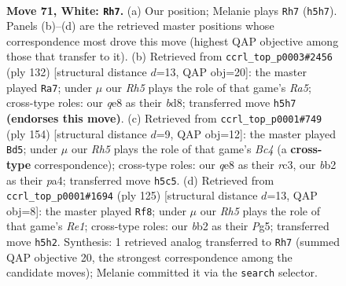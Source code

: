 \documentclass[11pt]{article}
\begin{document}
\clearpage

\begin{figure}[p]\centering
\begin{subfigure}{0.46\textwidth}\centering
\resizebox{\linewidth}{!}{%
\newchessgame
\chessboard[
  setfen={4q3/8/8/7R/1p6/3k1B2/1b6/5K2 w - - 32 71},
  showmover=false,
  pgfstyle=straightmove, color=movearrow, markmove={h5-h7}
]}
\caption{}
\end{subfigure}\hfill
\begin{subfigure}{0.46\textwidth}\centering
\resizebox{\linewidth}{!}{%
\newchessgame
\chessboard[
  setfen={3b4/1b6/8/R7/3B2k1/8/5K2/8 w - - 9 67},
  showmover=false,
  pgfstyle=straightmove, color=movearrow, markmove={a5-a7}
]}
\caption{}
\end{subfigure}
\\[4pt]
\begin{subfigure}{0.46\textwidth}\centering
\resizebox{\linewidth}{!}{%
\newchessgame
\chessboard[
  setfen={8/6k1/4R3/2b5/p1B5/2r5/6K1/8 w - - 12 78},
  showmover=false,
  pgfstyle=straightmove, color=movearrow, markmove={c4-d5}
]}
\caption{}
\end{subfigure}\hfill
\begin{subfigure}{0.46\textwidth}\centering
\resizebox{\linewidth}{!}{%
\newchessgame
\chessboard[
  setfen={4r3/3Q4/7k/6p1/8/1b6/8/7K b - - 9 63},
  showmover=false,
  pgfstyle=straightmove, color=movearrow, markmove={e8-f8}
]}
\caption{}
\end{subfigure}
\caption{\textbf{Move 71, White: \texttt{Rh7}.} (a) Our position; Melanie plays \texttt{Rh7} (\texttt{h5h7}). Panels (b)--(d) are the retrieved master positions whose correspondence most drove this move (highest QAP objective among those that transfer to it). (b) Retrieved from \texttt{ccrl\_top\_p0003\#2456} (ply 132) [structural distance $d$=13, QAP obj=20]: the master played \texttt{Ra7}; under $\mu$ our \emph{Rh5} plays the role of that game's \emph{Ra5}; cross-type roles: our \emph{q}e8 as their \emph{b}d8; transferred move \texttt{h5h7} \textbf{(endorses this move)}. (c) Retrieved from \texttt{ccrl\_top\_p0001\#749} (ply 154) [structural distance $d$=9, QAP obj=12]: the master played \texttt{Bd5}; under $\mu$ our \emph{Rh5} plays the role of that game's \emph{Bc4} (a \textbf{cross-type} correspondence); cross-type roles: our \emph{q}e8 as their \emph{r}c3, our \emph{b}b2 as their \emph{p}a4; transferred move \texttt{h5c5}. (d) Retrieved from \texttt{ccrl\_top\_p0001\#1694} (ply 125) [structural distance $d$=13, QAP obj=8]: the master played \texttt{Rf8}; under $\mu$ our \emph{Rh5} plays the role of that game's \emph{Re1}; cross-type roles: our \emph{b}b2 as their \emph{P}g5; transferred move \texttt{h5h2}. Synthesis: 1 retrieved analog transferred to \texttt{Rh7} (summed QAP objective 20, the strongest correspondence among the candidate moves); Melanie committed it via the \texttt{search} selector.}
\label{fig:thought-m140}
\end{figure}
\end{document}
